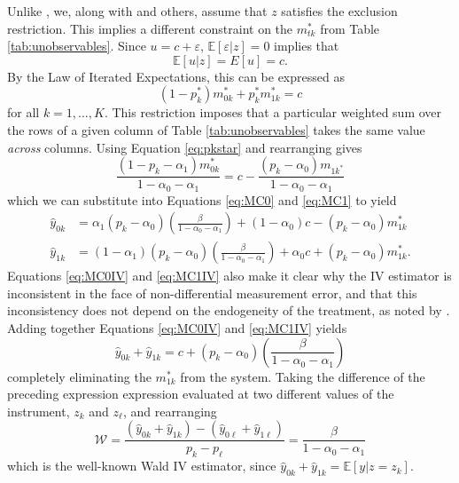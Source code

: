 Unlike \cite{Lewbel}, we, along with \cite{Mahajan} and others, assume that $z$ satisfies the exclusion restriction. 
This implies a different constraint on the $m^*_{tk}$ from Table \ref{tab:unobservables}.
Since $u = c + \varepsilon$, $\mathbb{E}[\varepsilon|z]=0$ implies that
\begin{equation}
  \mathbb{E}[u|z] = E[u] = c.
  \label{eq:validInstrument}
\end{equation}
By the Law of Iterated Expectations, this can be expressed as 
\begin{equation*}
  (1 - p_k^*)m_{0k}^* + p_k^* m_{1k}^* = c 
\end{equation*}
for all $k = 1, \dots, K$.
This restriction imposes that a particular weighted sum over the rows of a given column of Table \ref{tab:unobservables} takes the same value \emph{across} columns.
Using Equation \ref{eq:pkstar} and rearranging gives 
\begin{equation*}
  \frac{(1 - p_k - \alpha_1) m_{0k}^*}{1 - \alpha_0 - \alpha_1} = c - \frac{(p_k - \alpha_0)m_{1k^*}}{1 - \alpha_0 - \alpha_1}
\end{equation*}
which we can substitute into Equations \ref{eq:MC0} and \ref{eq:MC1} to yield
\begin{align}
  \label{eq:MC0IV}
  \hat{y}_{0k} &=\alpha_1(p_k - \alpha_0)\left(\frac{\beta}{1 - \alpha_0 - \alpha_1}\right) + (1-\alpha_0)c - (p _k -  \alpha_0)m_{1k}^* \\[1.5ex]
  \label{eq:MC1IV}
  \hat{y}_{1k} &=(1-\alpha_1)(p_k - \alpha_0)\left(\frac{\beta}{1 - \alpha_0 - \alpha_1}\right) + \alpha_0 c + (p _k -  \alpha_0)m_{1k}^*.
\end{align}
Equations \ref{eq:MC0IV} and \ref{eq:MC1IV} also make it clear why the IV estimator is inconsistent in the face of non-differential measurement error, and that this inconsistency does not depend on the endogeneity of the treatment, as noted by \cite{FL}.
Adding together Equations \ref{eq:MC0IV} and \ref{eq:MC1IV} yields
\begin{equation*}
  \hat{y}_{0k} + \hat{y}_{1k} = c + (p_k - \alpha_0)\left( \frac{\beta}{1 - \alpha_0 - \alpha_1} \right) 
\end{equation*}
completely eliminating the $m^*_{1k}$ from the system.
Taking the difference of the preceding expression expression evaluated at two different values of the instrument, $z_{k}$ and $z_{\ell}$, and rearranging
\begin{equation}
  \mathcal{W} = \frac{(\hat{y}_{0k} + \hat{y}_{1k}) - (\hat{y}_{0\ell} + \hat{y}_{1\ell})}{p_k - p_\ell} =  \frac{\beta}{1 - \alpha_0 - \alpha_1}
  \label{eq:wald}
\end{equation}
which is the well-known Wald IV estimator, since $\hat{y}_{0k} + \hat{y}_{1k} = \mathbb{E}[y|z = z_k]$.


